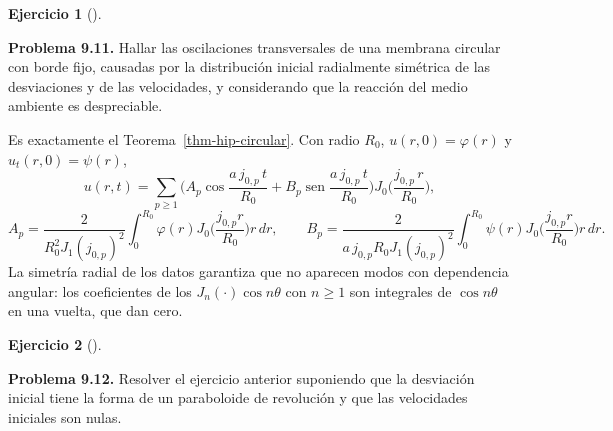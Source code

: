 \documentclass[
  spanish,
  a4paper,
]{scrbook}
\theoremstyle{definition}
\theoremstyle{plain}
\theoremstyle{definition}
\theoremstyle{plain}
\theoremstyle{definition}
\newtheorem{exercise}{Ejercicio}[chapter]
\theoremstyle{remark}
\begin{document}
\begin{exercise}[]\protect\hypertarget{exr-hip-p11}{}\label{exr-hip-p11}

\textbf{Problema 9.11.} Hallar las oscilaciones transversales de una
membrana circular con borde fijo, causadas por la distribución inicial
radialmente simétrica de las desviaciones y de las velocidades, y
considerando que la reacción del medio ambiente es despreciable.

\end{exercise}

\begin{tcolorbox}[enhanced jigsaw, arc=.35mm, bottomrule=.15mm, bottomtitle=1mm, breakable, colback=white, colbacktitle=quarto-callout-tip-color!10!white, colframe=quarto-callout-tip-color-frame, coltitle=black, left=2mm, leftrule=.75mm, opacityback=0, opacitybacktitle=0.6, rightrule=.15mm, title=\textcolor{quarto-callout-tip-color}{\faLightbulb}\hspace{0.5em}{Solución}, titlerule=0mm, toprule=.15mm, toptitle=1mm]

Es exactamente el Teorema~\ref{thm-hip-circular}. Con radio \(R_0\),
\(u(r,0) = \varphi(r)\) y \(u_t(r,0) = \psi(r)\), \[
u(r,t) = \sum_{p\ge1}\Big(A_p\cos\frac{a\,j_{0,p}\,t}{R_0} + B_p\operatorname{sen}\frac{a\,j_{0,p}\,t}{R_0}\Big)J_0\!\Big(\frac{j_{0,p}\,r}{R_0}\Big),
\] \[
A_p = \frac{2}{R_0^2J_1(j_{0,p})^2}\int_0^{R_0}\varphi(r)J_0\!\Big(\frac{j_{0,p}r}{R_0}\Big)r\,dr,
\qquad
B_p = \frac{2}{a\,j_{0,p}R_0J_1(j_{0,p})^2}\int_0^{R_0}\psi(r)J_0\!\Big(\frac{j_{0,p}r}{R_0}\Big)r\,dr .
\] La simetría radial de los datos garantiza que no aparecen modos con
dependencia angular: los coeficientes de los \(J_n(\cdot)\cos n\theta\)
con \(n\ge1\) son integrales de \(\cos n\theta\) en una vuelta, que dan
cero.

\end{tcolorbox}

\begin{exercise}[]\protect\hypertarget{exr-hip-p12}{}\label{exr-hip-p12}

\textbf{Problema 9.12.} Resolver el ejercicio anterior suponiendo que la
desviación inicial tiene la forma de un paraboloide de revolución y que
las velocidades iniciales son nulas.

\end{exercise}
\end{document}
